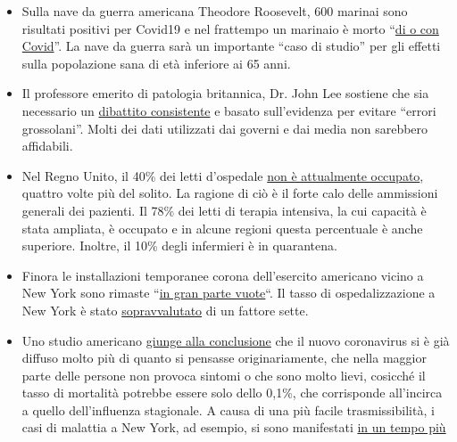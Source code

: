 \begin{itemize}
\tightlist
\item
  Sulla nave da guerra americana Theodore Roosevelt, 600 marinai sono
  risultati positivi per Covid19 e nel frattempo un marinaio è morto
  ``\href{https://www.theguardian.com/world/2020/apr/14/sailor-dies-from-covid-19-and-600-test-positive-after-outbreak-on-uss-theodore-roosevelt-guam}{di
  o con Covid}''. La nave da guerra sarà un importante ``caso di
  studio'' per gli effetti sulla popolazione sana di età inferiore ai 65
  anni.
\item
  Il professore emerito di patologia britannica, Dr. John Lee sostiene
  che sia necessario un
  \href{https://www.spectator.co.uk/article/to-understand-covid-we-need-evidence-scepticism-and-vigorous-debate}{dibattito
  consistente} e basato sull'evidenza per evitare ``errori grossolani''.
  Molti dei dati utilizzati dai governi e dai media non sarebbero
  affidabili.
\item
  Nel Regno Unito, il 40\% dei letti d'ospedale
  \href{https://www.hsj.co.uk/acute-care/nhs-hospitals-have-four-times-more-empty-beds-than-normal/7027392.article}{non
  è attualmente occupato}, quattro volte più del solito. La ragione di
  ciò è il forte calo delle ammissioni generali dei pazienti. Il 78\%
  dei letti di terapia intensiva, la cui capacità è stata ampliata, è
  occupato e in alcune regioni questa percentuale è anche superiore.
  Inoltre, il 10\% degli infermieri è in quarantena.
\item
  Finora le installazioni temporanee corona dell'esercito americano
  vicino a New York sono rimaste
  ``\href{https://nypost.com/2020/04/09/usns-comfort-and-javits-center-mostly-empty-amid-coronavirus/}{in
  gran parte vuote}``. Il tasso di ospedalizzazione a New York è stato
  \href{https://www.nytimes.com/2020/04/10/nyregion/new-york-coronavirus-hospitals.html}{sopravvalutato}
  di un fattore sette.
\item
  Uno studio americano
  \href{https://www.medrxiv.org/content/10.1101/2020.04.01.20050542v1}{giunge
  alla conclusione} che il nuovo coronavirus si è già diffuso molto più
  di quanto si pensasse originariamente, che nella maggior parte delle
  persone non provoca sintomi o che sono molto lievi, cosicché il tasso
  di mortalità potrebbe essere solo dello 0,1\%, che corrisponde
  all'incirca a quello dell'influenza stagionale. A causa di una più
  facile trasmissibilità, i casi di malattia a New York, ad esempio, si
  sono manifestati \href{https://archive.is/7w2XE}{in un tempo più
}
\end{itemize}
